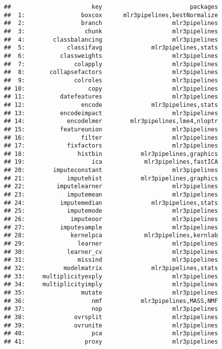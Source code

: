 \documentclass[
]{scrbook}
\begin{document}
\begin{verbatim}
##                       key                         packages
##  1:                boxcox      mlr3pipelines,bestNormalize
##  2:                branch                    mlr3pipelines
##  3:                 chunk                    mlr3pipelines
##  4:        classbalancing                    mlr3pipelines
##  5:            classifavg              mlr3pipelines,stats
##  6:          classweights                    mlr3pipelines
##  7:              colapply                    mlr3pipelines
##  8:       collapsefactors                    mlr3pipelines
##  9:              colroles                    mlr3pipelines
## 10:                  copy                    mlr3pipelines
## 11:          datefeatures                    mlr3pipelines
## 12:                encode              mlr3pipelines,stats
## 13:          encodeimpact                    mlr3pipelines
## 14:            encodelmer        mlr3pipelines,lme4,nloptr
## 15:          featureunion                    mlr3pipelines
## 16:                filter                    mlr3pipelines
## 17:            fixfactors                    mlr3pipelines
## 18:               histbin           mlr3pipelines,graphics
## 19:                   ica            mlr3pipelines,fastICA
## 20:        imputeconstant                    mlr3pipelines
## 21:            imputehist           mlr3pipelines,graphics
## 22:         imputelearner                    mlr3pipelines
## 23:            imputemean                    mlr3pipelines
## 24:          imputemedian              mlr3pipelines,stats
## 25:            imputemode                    mlr3pipelines
## 26:             imputeoor                    mlr3pipelines
## 27:          imputesample                    mlr3pipelines
## 28:             kernelpca            mlr3pipelines,kernlab
## 29:               learner                    mlr3pipelines
## 30:            learner_cv                    mlr3pipelines
## 31:               missind                    mlr3pipelines
## 32:           modelmatrix              mlr3pipelines,stats
## 33:     multiplicityexply                    mlr3pipelines
## 34:     multiplicityimply                    mlr3pipelines
## 35:                mutate                    mlr3pipelines
## 36:                   nmf           mlr3pipelines,MASS,NMF
## 37:                   nop                    mlr3pipelines
## 38:              ovrsplit                    mlr3pipelines
## 39:              ovrunite                    mlr3pipelines
## 40:                   pca                    mlr3pipelines
## 41:                 proxy                    mlr3pipelines

\end{verbatim}
\end{document}
